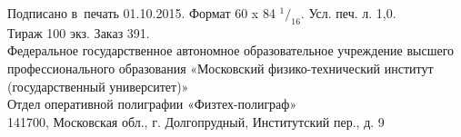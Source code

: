 \documentclass[a4paper,14pt]{extarticle}
\numberwithin{equation}{section}
\begin{document}
    \vspace{0.5em}

    \begin{center}
        \begin{singlespace}
            Подписано в~печать 01.10.2015. Формат 60 x 84 $^1/_{16}$. Усл. печ. л. 1,0.\\
            Тираж 100 экз. Заказ 391.\\
            Федеральное государственное автономное образовательное учреждение высшего профессионального образования «Московский физико-технический
            институт (государственный университет)»\\
            Отдел оперативной полиграфии «Физтех-полиграф»\\
            141700, Московская обл., г. Долгопрудный, Институтский пер., д. 9
        \end{singlespace}
    \end{center}
\end{document}
